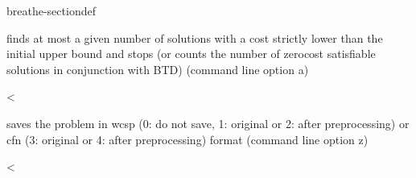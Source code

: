 \documentclass[letterpaper,10pt,openany,oneside,english]{sphinxmanual}
\begin{document}
\begin{fulllineitems}
\begin{sphinxuseclass}{breathe-sectiondef}
\begin{fulllineitems}
\sphinxAtStartPar
finds at most a given number of solutions with a cost strictly lower than the initial upper bound and stops (or counts the number of zero\sphinxhyphen{}cost satisfiable solutions in conjunction with BTD) (command line option \sphinxhyphen{}a) 

\end{fulllineitems}


\begin{fulllineitems}
\label{\detokenize{ref/ref_cpp:_CPPv4N8ToulBar222approximateCountingBTDE}}\label{\detokenize{ref/ref_cpp:_CPPv3N8ToulBar222approximateCountingBTDE}}\label{\detokenize{ref/ref_cpp:_CPPv2N8ToulBar222approximateCountingBTDE}}\label{\detokenize{ref/ref_cpp:ToulBar2::approximateCountingBTD__b}}
\pysigstartsignatures
\pysigstartmultiline
{}
\pysigstopmultiline
\pysigstopsignatures
\sphinxAtStartPar
\textless{} 

\sphinxAtStartPar
saves the problem in wcsp (0: do not save, 1: original or 2: after preprocessing) or cfn (3: original or 4: after preprocessing) format (command line option \sphinxhyphen{}z) 

\end{fulllineitems}


\begin{fulllineitems}
\label{\detokenize{ref/ref_cpp:_CPPv4N8ToulBar215binaryBranchingE}}\label{\detokenize{ref/ref_cpp:_CPPv3N8ToulBar215binaryBranchingE}}\label{\detokenize{ref/ref_cpp:_CPPv2N8ToulBar215binaryBranchingE}}\label{\detokenize{ref/ref_cpp:ToulBar2::binaryBranching__b}}
\pysigstartsignatures
\pysigstartmultiline
{}
\pysigstopmultiline
\pysigstopsignatures
\sphinxAtStartPar
\textless{} 


\end{fulllineitems}
\end{sphinxuseclass}
\end{fulllineitems}
\end{document}
